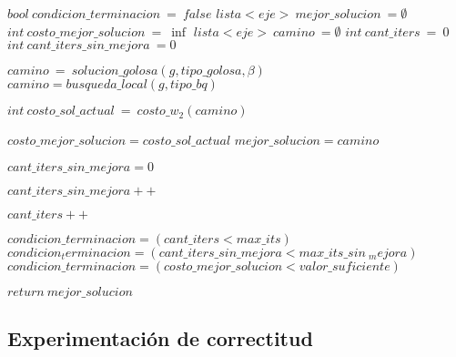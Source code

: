 \begin{algorithmic}


	\Statex
	\State $bool \: condicion\_terminacion\: =\: false$
    \State $lista<eje> \:mejor\_solucion\: = \emptyset$
    \State $int \:costo\_mejor\_solucion\: =\: \inf$
    \State $lista<eje> \:camino\: = \emptyset$
    \State $int\: cant\_iters \:= \:0$
    \State $int\: cant\_iters\_sin\_mejora \:= 0$


    	\State $camino\: =\: solucion\_golosa(g, tipo\_golosa, \beta)$
    			\State $camino = busqueda\_local(g, tipo\_bq)$
    	\EndWhile

    	\State $ int \:  costo\_sol\_actual \: = \: costo\_w_2(camino)$


            \State $costo\_mejor\_solucion = costo\_sol\_actual$
            \State $mejor\_solucion = camino$
            
            \State $cant\_iters\_sin\_mejora = 0$
        \Else
            
            \State $cant\_iters\_sin\_mejora++$
        \EndIf

        \State $cant\_iters++$
    

           \State $condicion\_terminacion = (cant\_iters < max\_its)$            
            \State $condicion_terminacion = (cant\_iters\_sin\_mejora < max\_its\_sin\ _mejora)$
            \State $condicion\_terminacion = (costo\_mejor\_solucion < valor\_suficiente)$
        \EndIf

       \EndWhile

       \State $return\:  mejor\_solucion$

\EndProcedure
\end{algorithmic}

\subsection{Experimentaci\'on de correctitud}